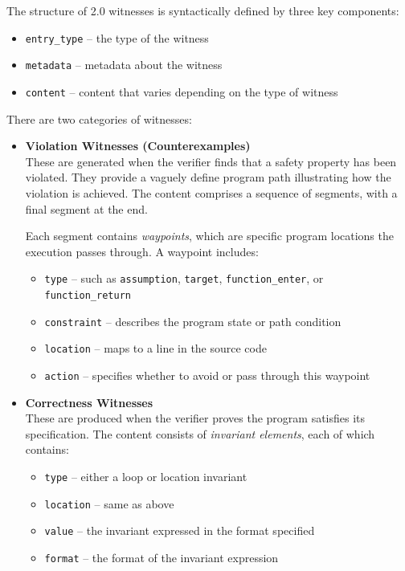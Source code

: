 The structure of 2.0 witnesses is syntactically defined by three key components:
\begin{itemize}
  \item \texttt{entry\_type} – the type of the witness
  \item \texttt{metadata} – metadata about the witness
  \item \texttt{content} – content that varies depending on the type of witness
\end{itemize}

There are two categories of witnesses:

\begin{itemize}
  \item \textbf{Violation Witnesses (Counterexamples)}\\
  These are generated when the verifier finds that a safety property has been violated. 
  They provide a vaguely define program path illustrating how the violation is achieved. 
  The content comprises a sequence of segments, with a final segment at the end.

  Each segment contains \textit{waypoints}, which are specific program locations the execution passes through. A waypoint includes:
  \begin{itemize}
    \item \texttt{type} – such as \texttt{assumption}, \texttt{target}, \texttt{function\_enter}, or \texttt{function\_return}
    \item \texttt{constraint} – describes the program state or path condition
    \item \texttt{location} – maps to a line in the source code
    \item \texttt{action} – specifies whether to avoid or pass through this waypoint
  \end{itemize}

  \item \textbf{Correctness Witnesses}\\
  These are produced when the verifier proves the program satisfies its specification. 
  The content consists of \textit{invariant elements}, each of which contains:
  \begin{itemize}
    \item \texttt{type} – either a loop or location invariant
    \item \texttt{location} – same as above
    \item \texttt{value} – the invariant expressed in the format specified
    \item \texttt{format} – the format of the invariant expression 
  \end{itemize}
\end{itemize}

